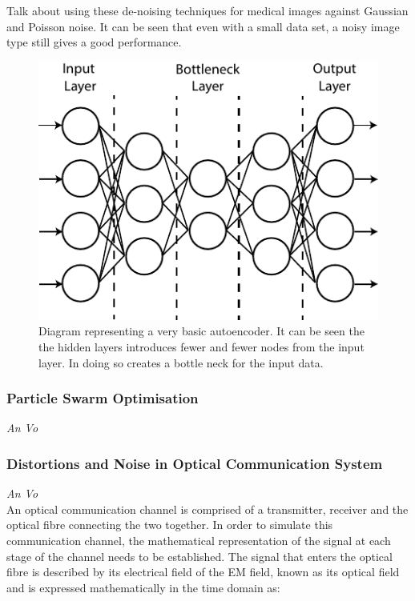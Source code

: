         \cite{7836672} Talk about using these de-noising techniques for medical images against Gaussian and Poisson noise. It can be seen that even with a small data set, a noisy image type still gives a good performance.
        \\
        
        \begin{figure}[H]
            \centering
            \includegraphics{resources/simple_autoencoder.pdf}
            \caption{Diagram representing a very basic autoencoder. It can be seen the the hidden layers introduces fewer and fewer nodes from the input layer. In doing so creates a bottle neck for the input data.}
            \label{fig:autoencoder}
        \end{figure}
    \subsubsection{Particle Swarm Optimisation}
        \hspace*{0pt}\hfill \textit{An Vo}\\
        
    \subsubsection{Distortions and Noise in Optical Communication System}
        \hspace*{0pt}\hfill \textit{An Vo}\\
        
        An optical communication channel is comprised of a transmitter, receiver and the optical fibre connecting the two together. In order to simulate this communication channel, the mathematical representation of the signal at each stage of the channel needs to be established. The signal that enters the optical fibre is described by its electrical field of the EM field, known as its optical field and is expressed mathematically in the time domain as: 
    
